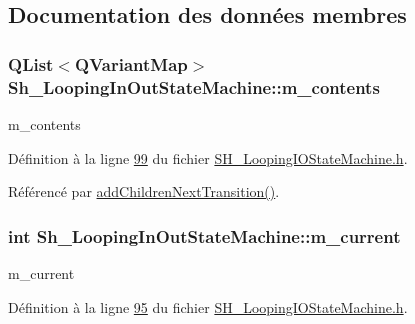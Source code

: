 \subsection{Documentation des données membres}
\hypertarget{classSh__LoopingInOutStateMachine_a267e7cbcb3d6a137e2a4e1f93fb57e68}{
\subsubsection[{m\-\_\-contents}]{\setlength{\rightskip}{0pt plus 5cm}Q\-List$<$Q\-Variant\-Map$>$ Sh\-\_\-\-Looping\-In\-Out\-State\-Machine\-::m\-\_\-contents\hspace{0.3cm}{\ttfamily [private]}}}\label{classSh__LoopingInOutStateMachine_a267e7cbcb3d6a137e2a4e1f93fb57e68}


m\-\_\-contents 



Définition à la ligne \hyperlink{SH__LoopingIOStateMachine_8h_source_l00099}{99} du fichier \hyperlink{SH__LoopingIOStateMachine_8h_source}{S\-H\-\_\-\-Looping\-I\-O\-State\-Machine.\-h}.



Référencé par \hyperlink{classSh__LoopingInOutStateMachine_acfd8d0711c793b13c759f6c50be6a315}{add\-Children\-Next\-Transition()}.

\hypertarget{classSh__LoopingInOutStateMachine_a6bcf7bcfe684dbd4d11ed327948e161b}{
\subsubsection[{m\-\_\-current}]{\setlength{\rightskip}{0pt plus 5cm}int Sh\-\_\-\-Looping\-In\-Out\-State\-Machine\-::m\-\_\-current\hspace{0.3cm}{\ttfamily [private]}}}\label{classSh__LoopingInOutStateMachine_a6bcf7bcfe684dbd4d11ed327948e161b}


m\-\_\-current 



Définition à la ligne \hyperlink{SH__LoopingIOStateMachine_8h_source_l00095}{95} du fichier \hyperlink{SH__LoopingIOStateMachine_8h_source}{S\-H\-\_\-\-Looping\-I\-O\-State\-Machine.\-h}.



